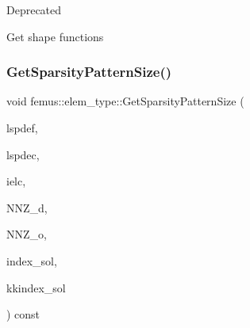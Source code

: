 \begin{DoxyRefDesc}{Deprecated}
\item[\mbox{\hyperlink{deprecated__deprecated000017}{Deprecated}}]Get shape functions \end{DoxyRefDesc}
\mbox{\label{classfemus_1_1elem__type_a6e40b6760ceb52bc3a6d5959ab1588ba}} 
\subsubsection{\texorpdfstring{Get\+Sparsity\+Pattern\+Size()}{GetSparsityPatternSize()}\hspace{0.1cm}{\footnotesize\ttfamily [1/3]}}
{\footnotesize\ttfamily void femus\+::elem\+\_\+type\+::\+Get\+Sparsity\+Pattern\+Size (\begin{DoxyParamCaption}\item[{const \mbox{\hyperlink{classfemus_1_1_linear_equation}{Linear\+Equation}} \&}]{lspdef,  }\item[{const \mbox{\hyperlink{classfemus_1_1_linear_equation}{Linear\+Equation}} \&}]{lspdec,  }\item[{const int \&}]{ielc,  }\item[{\mbox{\hyperlink{classfemus_1_1_numeric_vector}{Numeric\+Vector}} $\ast$}]{N\+N\+Z\+\_\+d,  }\item[{\mbox{\hyperlink{classfemus_1_1_numeric_vector}{Numeric\+Vector}} $\ast$}]{N\+N\+Z\+\_\+o,  }\item[{const unsigned \&}]{index\+\_\+sol,  }\item[{const unsigned \&}]{kkindex\+\_\+sol }\end{DoxyParamCaption}) const}

\mbox{\label{classfemus_1_1elem__type_a2e66f8115d7da31bc740db29e1524d60}} 
